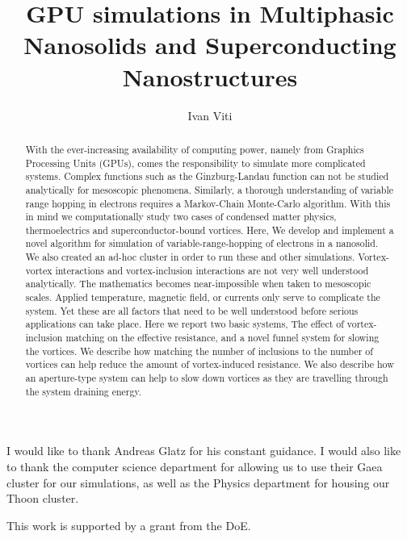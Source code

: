 \documentclass[12pt]{niuthesis}
\begin{document}
\title{GPU simulations in Multiphasic Nanosolids and Superconducting Nanostructures}

\author{Ivan Viti}


\begin{abstract}
	With the ever-increasing availability of computing power, namely from Graphics Processing Units (GPUs), comes the responsibility to simulate more complicated systems. Complex functions such as the Ginzburg-Landau function can not be studied analytically for mesoscopic phenomena. Similarly, a thorough understanding of variable range hopping in electrons requires a Markov-Chain Monte-Carlo algorithm. With this in mind we computationally study two cases of condensed matter physics, thermoelectrics and superconductor-bound vortices.
Here, We develop and implement a novel algorithm for simulation of variable-range-hopping of electrons in a nanosolid. We also created an ad-hoc cluster in order to run these and other simulations. 
	Vortex-vortex interactions and vortex-inclusion interactions are not very well understood analytically. The mathematics becomes near-impossible when taken to mesoscopic scales. Applied temperature, magnetic field, or currents only serve to complicate the system. Yet these are all factors that need to be well understood before serious applications can take place. Here we report two basic systems, The effect of vortex-inclusion matching on the effective resistance, and a novel funnel system for slowing the vortices. We describe how matching the number of inclusions to the number of vortices can help reduce the amount of vortex-induced resistance. We also describe how an aperture-type system can help to slow down vortices as they are travelling through the system draining energy. 



\end{abstract}

\begin{acknowledgments}
  I would like to thank Andreas Glatz for his constant guidance. I would also like to thank the computer science department for allowing us to use their Gaea cluster for our simulations, as well as the Physics department for housing our Thoon cluster.
  
  This work is supported by a grant from the DoE.
\end{acknowledgments}

\MakeThesisPrologue %






\appendix
\end{document}

